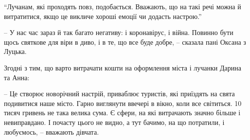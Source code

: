 \begin{zznagolos}
\enquote{Лучанам, які проходять повз, подобається. Вважають, що на такі речі можна й
витратитися, якщо це викличе хороші емоції чи додасть настрою.}
\end{zznagolos}

– У нас час зараз й так багато негативу: і коронавірус, і війна. Повинно бути
щось святкове для віри в диво, і в те, що все буде добре, – сказала пані Оксана
з Луцька.

Згодні з тим, що варто витрачати кошти на оформлення міста і лучанки Дарина та
Анна:

– Це створює новорічний настрій, приваблює туристів, які приїздять на свята
подивитися наше місто. Гарно виглянути ввечері в вікно, коли все світиться. 10
тисяч гривень не така велика сума. Є сфери, на які витрачають значно більше і
невиправдано. І почасту цього не видно, а тут бачимо, на що потратили, і
любуємось, – вважають дівчата.

